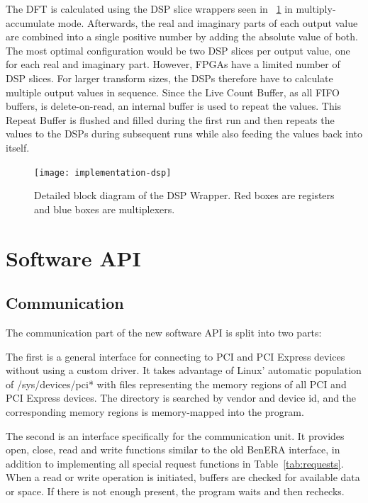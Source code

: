 The DFT is calculated using the DSP slice wrappers seen in \figurename~\ref{fig:implementation-dsp} in multiply-accumulate mode.
Afterwards, the real and imaginary parts of each output value are combined into a single positive number by adding the absolute value of both.
The most optimal configuration would be two DSP slices per output value, one for each real and imaginary part.
However, FPGAs have a limited number of DSP slices.
For larger transform sizes, the DSPs therefore have to calculate multiple output values in sequence.
Since the Live Count Buffer, as all FIFO buffers, is delete-on-read, an internal buffer is used to repeat the values.
This Repeat Buffer is flushed and filled during the first run and then repeats the values to the DSPs during subsequent runs while also feeding the values back into itself.

\begin{figure}[!ht]
    \centering
    \texttt{[image: implementation-dsp]}
    \caption[DSP Wrapper]{
        Detailed block diagram of the DSP Wrapper.
        Red boxes are registers and blue boxes are multiplexers.
    }
    \label{fig:implementation-dsp}
\end{figure}


\section{Software API}

\TODO

\subsection{Communication}

The communication part of the new software API is split into two parts:

The first is a general interface for connecting to PCI and PCI Express devices without using a custom driver.
It takes advantage of Linux' automatic population of /sys/devices/pci* with files representing the memory regions of all PCI and PCI Express devices.
The directory is searched by vendor and device id, and the corresponding memory regions is memory-mapped into the program.

The second is an interface specifically for the communication unit.
It provides open, close, read and write functions similar to the old BenERA interface, in addition to implementing all special request functions in Table~\ref{tab:requests}.
When a read or write operation is initiated, buffers are checked for available data or space.
If there is not enough present, the program waits and then rechecks.

